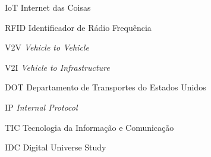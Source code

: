 \begin{siglas}
  \item[IoT] Internet das Coisas
  \item[RFID] Identificador de Rádio Frequência
  \item[V2V] \textit{Vehicle to Vehicle}
  \item[V2I] \textit{Vehicle to Infrastructure}
  \item[DOT] Departamento de Transportes do Estados Unidos
  \item[IP]  \textit{Internal Protocol}
  \item[TIC] Tecnologia da Informação e Comunicação
  \item[IDC] Digital Universe Study
\end{siglas}